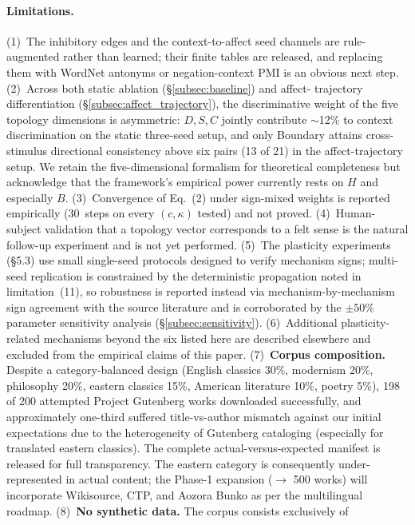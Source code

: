 \documentclass{article}
\begin{document}
\paragraph{Limitations.}
(1)~The inhibitory edges and the context-to-affect seed channels are
rule-augmented rather than learned; their finite tables are released, and
replacing them with WordNet antonyms or negation-context PMI is an obvious
next step.
(2)~Across both static ablation (\S\ref{subsec:baseline}) and affect-
trajectory differentiation (\S\ref{subsec:affect_trajectory}), the
discriminative weight of the five topology dimensions is asymmetric:
$D, S, C$ jointly contribute $\sim$12\% to context discrimination on the
static three-seed setup, and only Boundary attains cross-stimulus
directional consistency above six pairs (13 of 21) in the affect-trajectory
setup. We retain the five-dimensional formalism for theoretical completeness
but acknowledge that the framework's empirical power currently rests on
$H$ and especially $B$.
(3)~Convergence of Eq.~(2) under sign-mixed weights is reported empirically
(30~steps on every $(c, \kappa)$ tested) and not proved.
(4)~Human-subject validation that a topology vector corresponds to a felt
sense is the natural follow-up experiment and is not yet performed.
(5)~The plasticity experiments (\S 5.3) use small single-seed protocols
designed to verify mechanism signs; multi-seed replication is constrained
by the deterministic propagation noted in limitation~(11), so robustness
is reported instead via mechanism-by-mechanism sign agreement with the
source literature and is corroborated by the $\pm 50\%$ parameter
sensitivity analysis (\S\ref{subsec:sensitivity}).
(6)~Additional plasticity-related mechanisms beyond the six listed here are
described elsewhere and excluded from the empirical claims of this paper.
(7)~\textbf{Corpus composition.} Despite a category-balanced design
(English classics 30\%, modernism 20\%, philosophy 20\%, eastern classics
15\%, American literature 10\%, poetry 5\%), 198 of 200 attempted Project
Gutenberg works downloaded successfully, and approximately one-third
suffered title-vs-author mismatch against our initial expectations due to
the heterogeneity of Gutenberg cataloging (especially for translated
eastern classics). The complete actual-versus-expected manifest is released
for full transparency. The eastern category is consequently under-
represented in actual content; the Phase-1 expansion ($\rightarrow$ 500
works) will incorporate Wikisource, CTP, and Aozora Bunko as per the
multilingual roadmap.
(8)~\textbf{No synthetic data.} The corpus consists exclusively of
\end{document}

